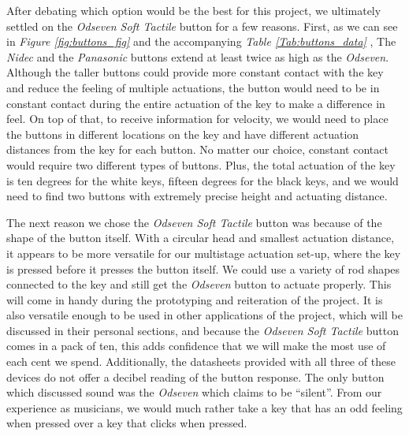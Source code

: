 \begin{table}[h!]
  \centering
  \caption{}
  \label{Tab:buttons_data}
\end{table}

After debating which option would be the best for this project, we ultimately settled on the \textit{Odseven Soft Tactile} button for a few reasons. First, as we can see in \textit{Figure \ref{fig:buttons_fig}} and the accompanying \textit{Table \ref{Tab:buttons_data}} , The \textit{Nidec} and the \textit{Panasonic} buttons extend at least twice as high as the \textit{Odseven}. Although the taller buttons could provide more constant contact with the key and reduce the feeling of multiple actuations, the button would need to be in constant contact during the entire actuation of the key to make a difference in feel. On top of that, to receive information for velocity, we would need to place the buttons in different locations on the key and have different actuation distances from the key for each button. No matter our choice, constant contact would require two different types of buttons. Plus, the total actuation of the key is ten degrees for the white keys, fifteen degrees for the black keys, and we would need to find two buttons with extremely precise height and actuating distance.

The next reason we chose the \textit{Odseven Soft Tactile} button was because of the shape of the button itself. With a circular head and smallest actuation distance, it appears to be more versatile for our multistage actuation set-up, where the key is pressed before it presses the button itself. We could use a variety of rod shapes connected to the key and still get the \textit{Odseven} button to actuate properly. This will come in handy during the prototyping and reiteration of the project. It is also versatile enough to be used in other applications of the project, which will be discussed in their personal sections, and because the \textit{Odseven Soft Tactile} button comes in a pack of ten, this adds confidence that we will make the most use of each cent we spend. Additionally, the datasheets provided with all three of these devices do not offer a decibel reading of the button response. The only button which discussed sound was the \textit{Odseven} which claims to be “silent”. From our experience as musicians, we would much rather take a key that has an odd feeling when pressed over a key that clicks when pressed.

